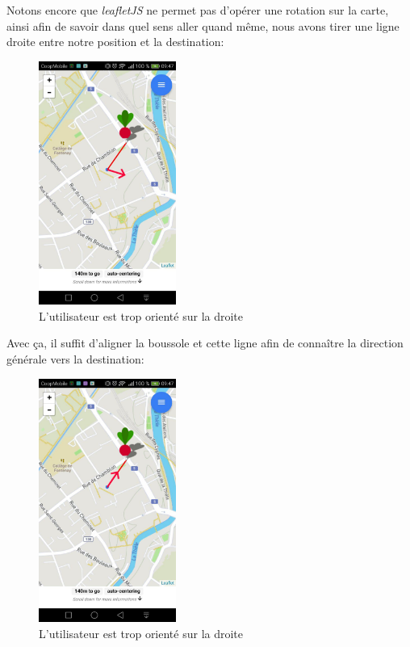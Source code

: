 \documentclass[french]{article}
\begin{document}
	Notons encore que \textit{leafletJS} ne permet pas d'opérer une rotation sur la carte, ainsi afin de savoir dans quel sens aller quand même, nous avons tirer une ligne droite entre notre position et la destination:
	\begin{figure}[H]
		\centering
		\includegraphics[width=0.4\textwidth]{../images/boussole-cote}
		\caption{L'utilisateur est trop orienté sur la droite}
	\end{figure}
	Avec ça, il suffit d'aligner la boussole et cette ligne afin de connaître la direction générale vers la destination:
	\begin{figure}[H]
		\centering
		\includegraphics[width=0.4\textwidth]{../images/boussole-droite}
		\caption{L'utilisateur est trop orienté sur la droite}
	\end{figure}
	
\end{document}
